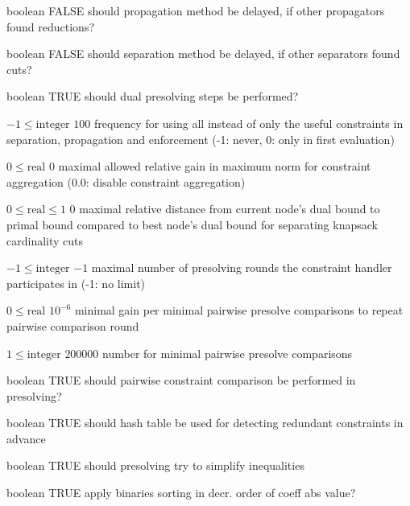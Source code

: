 %
{boolean}%
{FALSE}%
{should propagation method be delayed, if other propagators found reductions?}%
{}

%
{boolean}%
{FALSE}%
{should separation method be delayed, if other separators found cuts?}%
{}

%
{boolean}%
{TRUE}%
{should dual presolving steps be performed?}%
{}

%
{$-1\leq\textrm{integer}$}%
{$100$}%
{frequency for using all instead of only the useful constraints in separation, propagation and enforcement (-1: never, 0: only in first evaluation)}%
{}

%
{$0\leq\textrm{real}$}%
{$0$}%
{maximal allowed relative gain in maximum norm for constraint aggregation (0.0: disable constraint aggregation)}%
{}

%
{$0\leq\textrm{real}\leq1$}%
{$0$}%
{maximal relative distance from current node's dual bound to primal bound compared to best node's dual bound for separating knapsack cardinality cuts}%
{}

%
{$-1\leq\textrm{integer}$}%
{$-1$}%
{maximal number of presolving rounds the constraint handler participates in (-1: no limit)}%
{}

%
{$0\leq\textrm{real}$}%
{$10^{- 6}$}%
{minimal gain per minimal pairwise presolve comparisons to repeat pairwise comparison round}%
{}

%
{$1\leq\textrm{integer}$}%
{$200000$}%
{number for minimal pairwise presolve comparisons}%
{}

%
{boolean}%
{TRUE}%
{should pairwise constraint comparison be performed in presolving?}%
{}

%
{boolean}%
{TRUE}%
{should hash table be used for detecting redundant constraints in advance}%
{}

%
{boolean}%
{TRUE}%
{should presolving try to simplify inequalities}%
{}

%
{boolean}%
{TRUE}%
{apply binaries sorting in decr. order of coeff abs value?}%
{}

